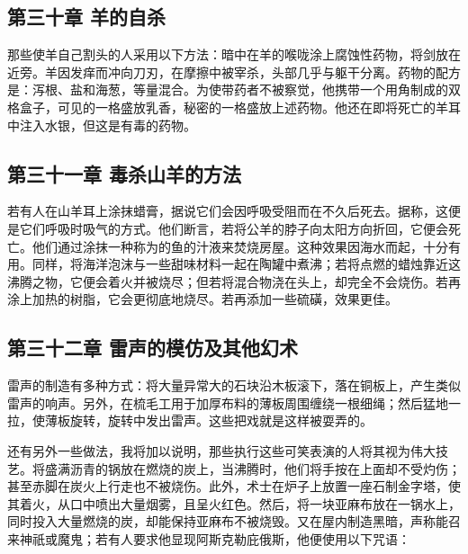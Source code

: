 \subsection{第三十章 羊的自杀}

那些使羊自己割头的人采用以下方法：暗中在羊的喉咙涂上腐蚀性药物，将剑放在近旁。羊因发痒而冲向刀刃，在摩擦中被宰杀，头部几乎与躯干分离。药物的配方是：泻根、盐和海葱，等量混合。为使带药者不被察觉，他携带一个用角制成的双格盒子，可见的一格盛放乳香，秘密的一格盛放上述药物。他还在即将死亡的羊耳中注入水银，但这是有毒的药物。\par


\subsection{第三十一章 毒杀山羊的方法}

若有人在山羊耳上涂抹蜡膏，据说它们会因呼吸受阻而在不久后死去。据称，这便是它们呼吸时吸气的方式。他们断言，若将公羊的脖子向太阳方向折回，它便会死亡。他们通过涂抹一种称为的鱼的汁液来焚烧房屋。这种效果因海水而起，十分有用。同样，将海洋泡沫与一些甜味材料一起在陶罐中煮沸；若将点燃的蜡烛靠近这沸腾之物，它便会着火并被烧尽；但若将混合物浇在头上，却完全不会烧伤。若再涂上加热的树脂，它会更彻底地烧尽。若再添加一些硫磺，效果更佳。\par


\subsection{第三十二章 雷声的模仿及其他幻术}

雷声的制造有多种方式：将大量异常大的石块沿木板滚下，落在铜板上，产生类似雷声的响声。另外，在梳毛工用于加厚布料的薄板周围缠绕一根细绳；然后猛地一拉，使薄板旋转，旋转中发出雷声。这些把戏就是这样被耍弄的。\par

还有另外一些做法，我将加以说明，那些执行这些可笑表演的人将其视为伟大技艺。将盛满沥青的锅放在燃烧的炭上，当沸腾时，他们将手按在上面却不受灼伤；甚至赤脚在炭火上行走也不被烧伤。此外，术士在炉子上放置一座石制金字塔，使其着火，从口中喷出大量烟雾，且呈火红色。然后，将一块亚麻布放在一锅水上，同时投入大量燃烧的炭，却能保持亚麻布不被烧毁。又在屋内制造黑暗，声称能召来神祇或魔鬼；若有人要求他显现阿斯克勒庇俄斯，他便使用以下咒语：\par

